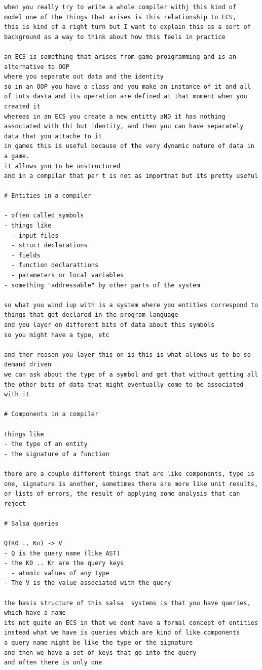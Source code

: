 \documentclass[12pt, a4paper]{report}
\begin{document}
\begin{verbatim}
when you really try to write a whole compiler withj this kind of
model one of the things that arises is this relationship to ECS,
this is kind of a right turn but I want to explain this as a sort of
background as a way to think about how this feels in practice

an ECS is something that arises from game proigramming and is an
alternative to OOP
where you separate out data and the identity
so in an OOP you have a class and you make an instance of it and all
of iots dasta and its operation are defined at that moment when you
created it
whereas in an ECS you create a new entitty aND it has nothing
associated with thi but identity, and then you can have separately
data that you attache to it
in games this is useful because of the very dynamic nature of data in
a game.
it allows you to be unstructured
and in a compilar that par t is not as importnat but its pretty useful

# Entities in a compiler

- often called symbols
- things like
  - input files
  - struct declarations
  - fields
  - function declarattions
  - parameters or local variables
- something "addressable" by other parts of the system

so what you wind iup with is a system where you entities correspond to
things that get declared in the program language
and you layer on different bits of data about this symbols
so you might have a type, etc

and ther reason you layer this on is this is what allows us to be so
demand driven
we can ask about the type of a symbol and get that without getting all
the other bits of data that might eventually come to be associated with it

# Components in a compiler

things like
- the type of an entity
- the signature of a function

there are a couple different things that are like components, type is
one, signature is another, sometimes there are more like unit results,
or lists of errors, the result of applying some analysis that can
reject

# Salsa queries

Q(K0 .. Kn) -> V
- Q is the query name (like AST)
- the K0 .. Kn are the query keys
  - atomic values of any type
- The V is the value associated with the query

the basis structure of this salsa  systems is that you have queries,
which have a name
its not quite an ECS in that we dont have a formal concept of entities
instead what we have is queries which are kind of like components
a query name might be like the type or the signature
and then we have a set of keys that go into the query
and often there is only one


\end{verbatim}
\end{document}
